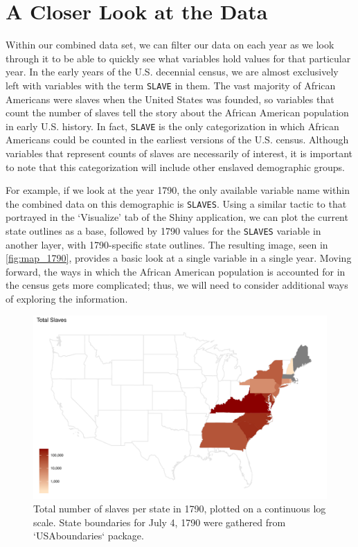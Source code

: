\documentclass[DIV=calc, paper=a4, fontsize=10pt, twocolumn]{scrartcl}\usepackage[]{graphicx}\usepackage[]{color}
\newenvironment{knitrout}{}{} %
\begin{document}
\section*{A Closer Look at the Data}

\par Within our combined data set, we can filter our data on each year as we look through it to be able to quickly see what variables hold values for that particular year. In the early years of the U.S. decennial census, we are almost exclusively left with variables with the term \texttt{SLAVE} in them. The vast majority of African Americans were slaves when the United States was founded, so variables that count the number of slaves tell the story about the African American population in early U.S. history. In fact, \texttt{SLAVE} is the only categorization in which African Americans could be counted in the earliest versions of the U.S. census. Although variables that represent counts of slaves are necessarily of interest, it is important to note that this categorization will include other enslaved demographic groups.







\par For example, if we look at the year 1790, the only available variable name within the combined data on this demographic is \texttt{SLAVES}. Using a similar tactic to that portrayed in the `Visualize' tab of the Shiny application, we can plot the current state outlines as a base, followed by 1790 values for the \texttt{SLAVES} variable in another layer, with 1790-specific state outlines. The resulting image, seen in \autoref{fig:map_1790}, provides a basic look at a single variable in a single year. Moving forward, the ways in which the African American population is accounted for in the census gets more complicated; thus, we will need to consider additional ways of exploring the information.  

\begin{knitrout}
\color{fgcolor}\begin{figure}[h]
\includegraphics[width=.5\textwidth]{figure/map_1790-1} \caption[Total number of slaves per state in 1790, plotted on a continuous log scale]{Total number of slaves per state in 1790, plotted on a continuous log scale. State boundaries for July 4, 1790 were gathered from `USAboundaries` package.}\label{fig:map_1790}
\end{figure}


\end{knitrout}
\end{document}
